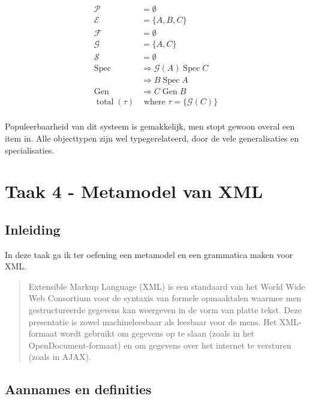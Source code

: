 \documentclass[10pt]{article}
\newcommand{\Spec}{\ensuremath{\operatorname{Spec}}}
\newcommand{\Gen}{\ensuremath{\operatorname{Gen}}}
\newcommand{\total}{\ensuremath{\operatorname{total}}}
\begin{document}
\begin{align*}
  \mathcal{P}   & = \emptyset                               \\
  \mathcal{E}   & = \{A, B, C\}                             \\
  \mathcal{F}   & = \emptyset                               \\
  \mathcal{G}   & = \{A, C\}                                \\
  \mathcal{S}   & = \emptyset                               \\
  \Spec         & \Rightarrow \mathcal{G} (A) \Spec C       \\
                & \Rightarrow B \Spec A                     \\
  \Gen          & \Rightarrow C \Gen B                      \\
  \total (\tau) & \text{ where } \tau = \{\mathcal{G} (C)\} \\
\end{align*}

Populeerbaarheid van dit systeem is gemakkelijk, men stopt gewoon overal een
item in. Alle objecttypen zijn wel typegerelateerd, door de vele generalisaties
en specialisaties.


\section{Taak 4 - Metamodel van XML}

\subsection{Inleiding}

In deze taak ga ik ter oefening een metamodel en een grammatica maken voor XML. 

\begin{quote}

Extensible Markup Language (XML) is een standaard van het World Wide Web
Consortium voor de syntaxis van formele opmaaktalen waarmee men gestructureerde
gegevens kan weergeven in de vorm van platte tekst. Deze presentatie is zowel
machineleesbaar als leesbaar voor de mens. Het XML-formaat wordt gebruikt om
gegevens op te slaan (zoals in het OpenDocument-formaat) en om gegevens over
het internet te versturen (zoals in AJAX).\cite{xmlwikipedia}
\end{quote}

\subsection{Aannames en definities}
\end{document}
